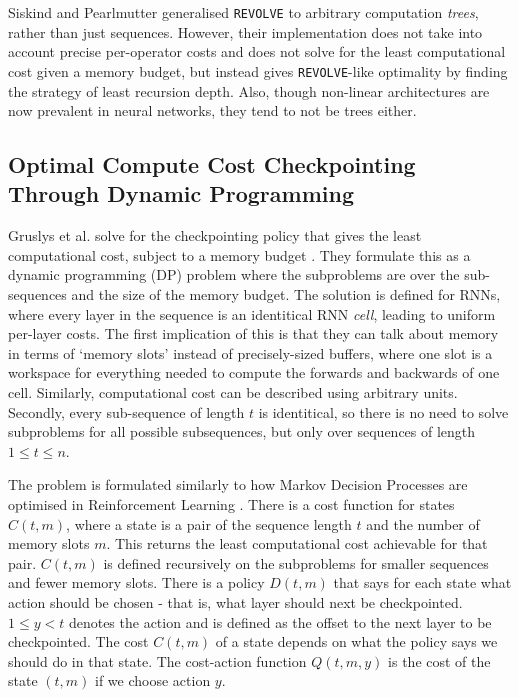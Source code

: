 Siskind and Pearlmutter \cite{Siskind2018} generalised \texttt{REVOLVE} to arbitrary computation \textit{trees}, rather than just sequences.
However, their implementation does not take into account precise per-operator costs and does not solve for the least computational cost given a memory budget, but instead gives \texttt{REVOLVE}-like optimality by finding the strategy of least recursion depth.
Also, though non-linear architectures are now prevalent in neural networks, they tend to not be trees either.


\subsection{Optimal Compute Cost Checkpointing Through Dynamic Programming} \label{sec:2-5-dp-checkpointing}
Gruslys et al. solve for the checkpointing policy that gives the least computational cost, subject to a memory budget \cite{Gruslys2016}.
They formulate this as a dynamic programming (DP) problem where the subproblems are over the sub-sequences and the size of the memory budget.
The solution is defined for RNNs, where every layer in the sequence is an identitical RNN \textit{cell}, leading to uniform per-layer costs.
The first implication of this is that they can talk about memory in terms of `memory slots' instead of precisely-sized buffers, where one slot is a workspace for everything needed to compute the forwards and backwards of one cell.
Similarly, computational cost can be described using arbitrary units.
Secondly, every sub-sequence of length \(t\) is identitical, so there is no need to solve subproblems for all possible subsequences, but only over sequences of length \(1\leq t\leq n\).

The problem is formulated similarly to how Markov Decision Processes are optimised in Reinforcement Learning \cite{Bellman1954, Sutton1998}.
There is a cost function for states \(C(t, m)\), where a state is a pair of the sequence length \(t\) and the number of memory slots \(m\).
This returns the least computational cost achievable for that pair.
\(C(t, m)\) is defined recursively on the subproblems for smaller sequences and fewer memory slots.
There is a policy \(D(t, m)\) that says for each state what action should be chosen - that is, what layer should next be checkpointed. \(1 \leq y < t\) denotes the action and is defined as the offset to the next layer to be checkpointed.
The cost \(C(t, m)\) of a state depends on what the policy says we should do in that state.
The cost-action function \(Q(t, m, y)\) is the cost of the state \((t, m)\) if we choose action \(y\).

